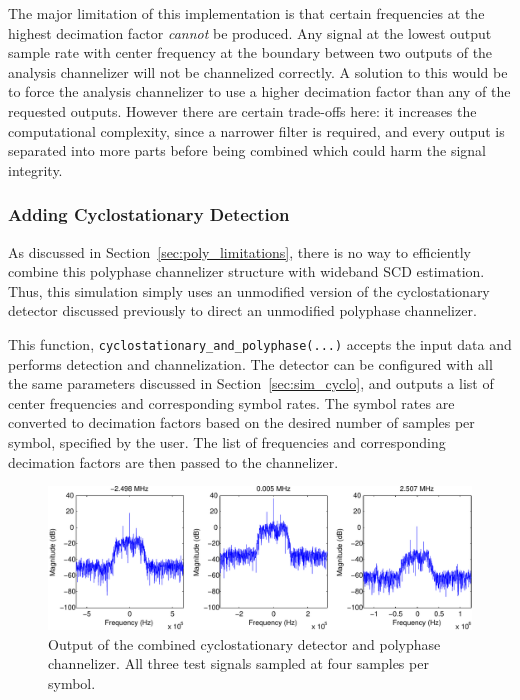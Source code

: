 \documentclass[12pt]{article}
\begin{document}
The major limitation of this implementation is that certain frequencies at the
highest decimation factor \emph{cannot} be produced. Any signal at the lowest
output sample rate with center frequency at the boundary between two outputs of
the analysis channelizer will not be channelized correctly. A solution to this
would be to force the analysis channelizer to use a higher decimation factor
than any of the requested outputs.  However there are certain trade-offs here:
it increases the computational complexity, since a narrower filter is
required, and every output is separated into more parts before being
combined which could harm the signal integrity.

\subsubsection{Adding Cyclostationary Detection}
\label{sec:sim_poly_cyclo}
As discussed in Section~\ref{sec:poly_limitations}, there is no way to
efficiently combine this polyphase channelizer structure with wideband SCD
estimation.  Thus, this simulation simply uses an unmodified version of the
cyclostationary detector discussed previously to direct an unmodified polyphase
channelizer.

This function, \texttt{cyclostationary\_and\_polyphase(...)} accepts the input
data and performs detection and channelization. The detector can be configured
with all the same parameters discussed in Section~\ref{sec:sim_cyclo}, and
outputs a list of center frequencies and corresponding symbol rates.
The symbol rates are converted to decimation factors based on the desired number
of samples per symbol, specified by the user. The list of frequencies and
corresponding decimation factors are then passed to the channelizer.

\begin{figure}[bh!]
    \includegraphics[width=\textwidth]{cyclo_poly_results}%
\caption{Output of the combined cyclostationary detector and polyphase channelizer. All three test signals sampled at four samples per symbol.}
\label{fig:cyclo_poly_results}
\end{figure}
\end{document}

